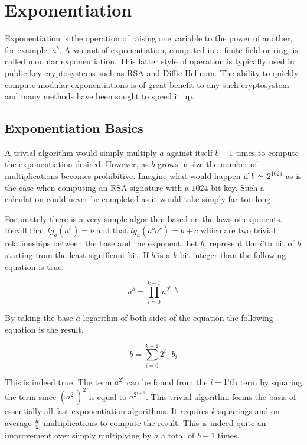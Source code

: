 \documentclass[b5paper]{book}
\def\approx{\raisebox{0.2ex}{\mbox{\small $\sim$}}}
\begin{document}
\chapter{Exponentiation}
Exponentiation is the operation of raising one variable to the power of another, for example, $a^b$.  A variant of exponentiation, computed
in a finite field or ring, is called modular exponentiation.  This latter style of operation is typically used in public key 
cryptosystems such as RSA and Diffie-Hellman.  The ability to quickly compute modular exponentiations is of great benefit to any
such cryptosystem and many methods have been sought to speed it up.

\section{Exponentiation Basics}
A trivial algorithm would simply multiply $a$ against itself $b - 1$ times to compute the exponentiation desired.  However, as $b$ grows in size
the number of multiplications becomes prohibitive.  Imagine what would happen if $b$ $\approx$ $2^{1024}$ as is the case when computing an RSA signature
with a $1024$-bit key.  Such a calculation could never be completed as it would take simply far too long.

Fortunately there is a very simple algorithm based on the laws of exponents.  Recall that $lg_a(a^b) = b$ and that $lg_a(a^ba^c) = b + c$ which
are two trivial relationships between the base and the exponent.  Let $b_i$ represent the $i$'th bit of $b$ starting from the least 
significant bit.  If $b$ is a $k$-bit integer than the following equation is true.

\begin{equation}
a^b = \prod_{i=0}^{k-1} a^{2^i \cdot b_i}
\end{equation}

By taking the base $a$ logarithm of both sides of the equation the following equation is the result.

\begin{equation}
b = \sum_{i=0}^{k-1}2^i \cdot b_i
\end{equation}

This is indeed true.  The term $a^{2^i}$ can be found from the $i - 1$'th term by squaring the term since $\left ( a^{2^i} \right )^2$ is equal to
$a^{2^{i+1}}$.  This trivial algorithm forms the basis of essentially all fast exponentiation algorithms.  It requires $k$ squarings and on average
$k \over 2$ multiplications to compute the result.  This is indeed quite an improvement over simply multiplying by $a$ a total of $b-1$ times.
\end{document}
